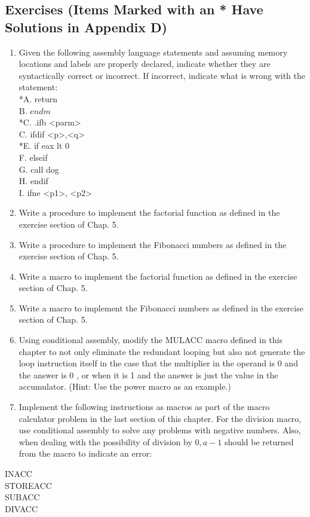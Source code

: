 \documentclass[10pt]{article}
\begin{document}
\subsection*{Exercises (Items Marked with an * Have Solutions in Appendix D)}
\begin{enumerate}
  \item Given the following assembly language statements and assuming memory locations and labels are properly declared, indicate whether they are syntactically correct or incorrect. If incorrect, indicate what is wrong with the statement:\\
*A. return\\
B. $e n d m$\\
*C. .ifb <parm>\\
C. ifdif <p>,<q>\\
*E. if eax lt 0\\
F. elseif\\
G. call dog\\
H. endif\\
I. ifne <p1>, <p2>
  \item Write a procedure to implement the factorial function as defined in the exercise section of Chap. 5.
  \item Write a procedure to implement the Fibonacci numbers as defined in the exercise section of Chap. 5.
  \item Write a macro to implement the factorial function as defined in the exercise section of Chap. 5.
  \item Write a macro to implement the Fibonacci numbers as defined in the exercise section of Chap. 5.
  \item Using conditional assembly, modify the MULACC macro defined in this chapter to not only eliminate the redundant looping but also not generate the loop instruction itself in the case that the multiplier in the operand is 0 and the answer is 0 , or when it is 1 and the answer is just the value in the accumulator. (Hint: Use the power macro as an example.)
  \item Implement the following instructions as macros as part of the macro calculator problem in the last section of this chapter. For the division macro, use conditional assembly to solve any problems with negative numbers. Also, when dealing with the possibility of division by $0, a-1$ should be returned from the macro to indicate an error:
\end{enumerate}

INACC\\
STOREACC\\
SUBACC\\
DIVACC
\end{document}
